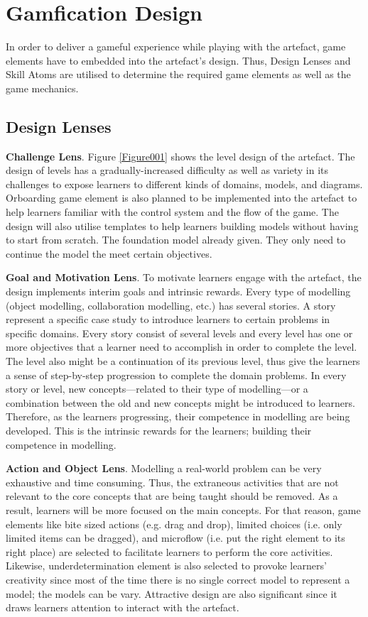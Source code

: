 \documentclass[runningheads,a4paper]{llncs}
\begin{document}
\section{Gamfication Design}
In order to deliver a gameful experience while playing with the artefact, game elements have to embedded into the artefact's design. Thus, Design Lenses and Skill Atoms \cite{deterding2015lens} are utilised to determine the required game elements as well as the game mechanics. 

\subsection{Design Lenses}
\textbf{Challenge Lens}. Figure \ref{Figure001} shows the level design of the artefact. The design of levels has a gradually-increased difficulty as well as variety in its challenges to expose learners to different kinds of domains, models, and diagrams. Orboarding game element is also planned to be implemented into the artefact to help learners familiar with the control system and the flow of the game. The design will also utilise templates to help learners building models without having to start from scratch. The foundation model already given. They only need to continue the model the meet certain objectives.

\textbf{Goal and Motivation Lens}. To motivate learners engage with the artefact, the design implements interim goals and intrinsic rewards. Every type of modelling (object modelling, collaboration modelling, etc.) has several stories. A story represent a specific case study to introduce learners to certain problems in specific domains. Every story consist of several levels and every level has one or more objectives that a learner need to accomplish in order to complete the level. The level also might be a continuation of its previous level, thus give the learners a sense of step-by-step progression to complete the domain problems. In every story or level, new concepts---related to their type of modelling---or a combination between the old and new concepts might be introduced to learners. Therefore, as the learners progressing, their competence in modelling are being  developed. This is the intrinsic rewards for the learners; building their competence in modelling. 

\textbf{Action and Object Lens}. Modelling a real-world problem can be very exhaustive and time consuming. Thus, the extraneous activities that are not relevant to the core concepts that are being taught should be removed. As a result, learners will be more focused on the main concepts. For that reason, game elements like bite sized actions (e.g. drag and drop), limited choices (i.e. only limited items can be dragged), and microflow (i.e. put the right element to its right place) are selected to facilitate learners to perform the core activities. Likewise, underdetermination element is also selected to provoke learners' creativity since most of the time there is no single correct model to represent a model; the models can be vary. Attractive design are also significant since it draws learners attention to interact with the artefact.
\end{document}

